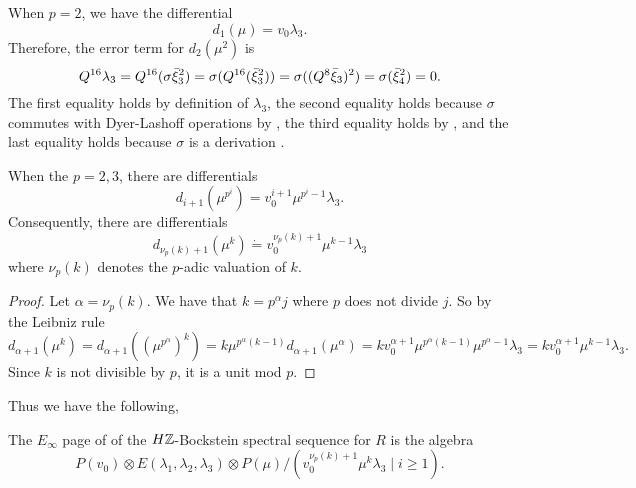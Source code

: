 When $p=2$, we have the differential 
\[
d_1(\mu)=v_0\lambda_3.
\]
Therefore, the error term for $d_2(\mu^2)$ is 
\[
Q^{16}\lambda_3 = Q^{16}(\sigma\bar{\xi}_3^2) = \sigma(Q^{16}(\bar{\xi}_3^2)) = \sigma((Q^8\bar{\xi}_3)^2) = \sigma(\bar{\xi}_4^2)=0.
\]
The first equality holds by definition of $\lambda_3$, the second equality holds because $\sigma$ commutes with Dyer-Lashoff operations by \cite{Bok85}, the third equality holds by \cite{BMMS86}, and the last equality holds because $\sigma$ is a derivation \cite{AngeltveitRognes}.
\begin{cor}
	When the $p=2,3$, there are differentials
	\[
	d_{i+1}(\mu^{p^i}) = v_0^{i+1}\mu^{p^i-1}\lambda_3.
	\]
	Consequently, there are differentials
	\[
	d_{\nu_p(k)+1}(\mu^k) \dot{=}v_0^{\nu_p(k)+1}\mu^{k-1}\lambda_3
	\]
	where $\nu_p(k)$ denotes the $p$-adic valuation of $k$.
\end{cor}
\begin{proof}
	Let $\alpha=\nu_p(k)$. We have that $k=p^\alpha j$ where $p$ does not divide $j$. So by the Leibniz rule
	\[
	d_{\alpha+1}(\mu^{k}) = d_{\alpha+1}((\mu^{p^\alpha})^k) = k\mu^{p^{\alpha}(k-1)}d_{\alpha+1}(\mu^{\alpha}) = kv_0^{\alpha+1}\mu^{p^\alpha (k-1)}\mu^{p^{\alpha}-1}\lambda_3 = kv_0^{\alpha+1}\mu^{k-1}\lambda_3.
	\]
	Since $k$ is not divisible by $p$, it is a unit mod $p$.
\end{proof}
Thus we have the following,
\begin{cor}
The $E_\infty$ page of of the $H\mathbb{Z}$-Bockstein spectral sequence for $R$ is the algebra
\[
P(v_0)\otimes E(\lambda_1,\lambda_2,\lambda_3)\otimes P(\mu)/(v_0^{\nu_p(k)+1}\mu^k\lambda_3\mid i\geq 1).
\]	
\end{cor}

